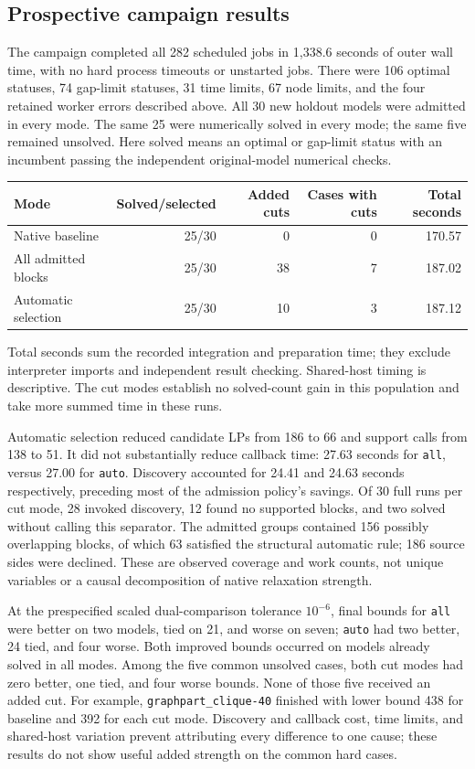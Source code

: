\subsection{Prospective campaign results}

The campaign completed all 282 scheduled jobs in 1,338.6 seconds of outer
wall time, with no hard process timeouts or unstarted jobs. There were
106 optimal statuses, 74 gap-limit statuses, 31 time limits, 67 node
limits, and the four retained worker errors described above. All 30 new
holdout models were admitted in every mode. The same 25 were numerically
solved in every mode; the same five remained unsolved. Here solved means
an optimal or gap-limit status with an incumbent passing the independent
original-model numerical checks.

\begin{center}
\begin{tabular}{lrrrr}
\toprule
Mode & Solved/selected & Added cuts & Cases with cuts & Total seconds\\
\midrule
Native baseline & 25/30 & 0 & 0 & 170.57\\
All admitted blocks & 25/30 & 38 & 7 & 187.02\\
Automatic selection & 25/30 & 10 & 3 & 187.12\\
\bottomrule
\end{tabular}
\end{center}
Total seconds sum the recorded integration and preparation time; they
exclude interpreter imports and independent result checking. Shared-host
timing is descriptive. The cut modes establish no solved-count gain in
this population and take more summed time in these runs.

Automatic selection reduced candidate LPs from 186 to 66 and support
calls from 138 to 51. It did not substantially reduce callback time:
27.63 seconds for \texttt{all}, versus 27.00 for \texttt{auto}.
Discovery accounted for 24.41 and 24.63 seconds respectively, preceding
most of the admission policy's savings. Of 30 full runs per cut mode,
28 invoked discovery, 12 found no supported blocks, and two solved
without calling this separator. The admitted groups contained 156
possibly overlapping blocks, of which 63 satisfied the structural
automatic rule; 186 source sides were declined. These are observed
coverage and work counts, not unique variables or a causal decomposition
of native relaxation strength.

At the prespecified scaled dual-comparison tolerance $10^{-6}$, final
bounds for \texttt{all} were better on two models, tied on 21, and worse
on seven; \texttt{auto} had two better, 24 tied, and four worse. Both
improved bounds occurred on models already solved in all modes.
Among the five common unsolved cases, both cut modes had zero better,
one tied, and four worse bounds. None of those five received an added
cut. For example, \texttt{graphpart\_clique-40} finished with lower
bound 438 for baseline and 392 for each cut mode. Discovery and callback
cost, time limits, and shared-host variation prevent attributing every
difference to one cause; these results do not show useful added strength
on the common hard cases.

